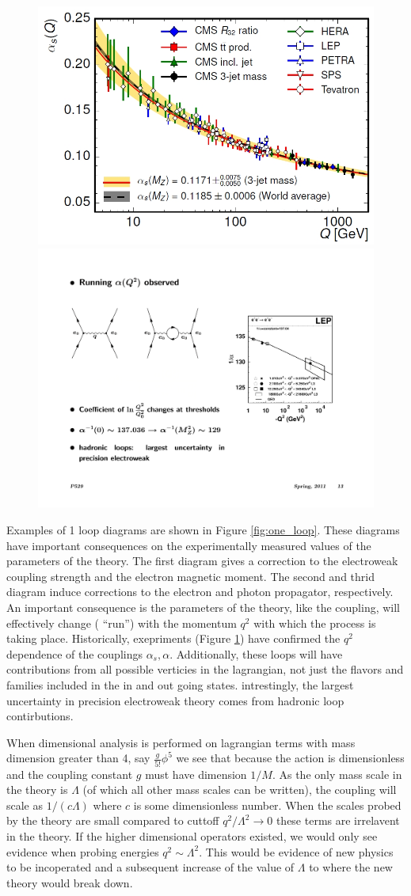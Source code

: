 \begin{figure}
\begin{center}
\includegraphics[width=.45\textwidth]{pics/alpha_s}
\includegraphics[width=.45\textwidth]{pics/alpha_qed}
\end{center}
\caption{}
\label{fig:running_coupling}
\end{figure}

Examples of 1 loop diagrams are shown in Figure \ref{fig:one_loop}. These diagrams have important consequences on the
experimentally measured values of the parameters of the theory. The first diagram gives a correction to the electroweak coupling strength and the electron magnetic moment. The second and thrid diagram induce corrections to the electron and photon propagator, respectively. An important consequence is the parameters of the theory, like the coupling, will effectively change ( ``run'') with the momentum $q^2$ with which the process is taking place. Historically, exepriments (Figure \ref{fig:running_coupling}) have confirmed the $q^2$ dependence of the couplings $\alpha_s, \alpha$. Additionally, these loops will have contributions from all possible verticies in the lagrangian, not just the flavors and families included in the in and 
out going states. intrestingly, the largest uncertainty in precision electroweak theory comes from hadronic loop contirbutions.

When  dimensional analysis is performed on lagrangian terms with mass dimension greater than 4, say $\frac{g}{5!}\phi^5$ 
we see that because the action is dimensionless and the coupling constant $g$ must have dimension $1/M$. As the only
mass scale in the theory is $\Lambda$ (of which all other mass scales can be written),  
the coupling will scale as $1/ (c \Lambda)$ where $c$ is some dimensionless number. 
When the scales probed by the theory are small compared to cuttoff $q^2/\Lambda^2 \rightarrow 0$
 these terms are irrelavent in the theory. If the higher dimensional operators existed, we would only
see evidence when probing energies $q^2 \sim \Lambda^2$.  This would be evidence of new physics to 
be incoperated and a subsequent increase of the value of $\Lambda$ to where the new theory would break down. 

